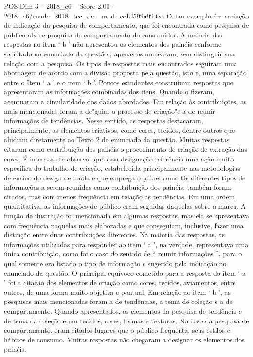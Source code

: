 \begin{textsample}{POS Dim 3 – 2018\_c6 – Score 2.00 – 2018\_c6/enade\_2018\_tec\_des\_mod\_ce1d599a99.txt}
Outro exemplo é a variação de indicação da pesquisa de comportamento, que foi encontrada como pesquisa de público-alvo e pesquisa de comportamento do consumidor.
A maioria das respostas no item ‘ b ’ não apresentou os elementos dos painéis conforme solicitado no enunciado da questão ; apenas os nomearam, sem distinguir sua relação com a pesquisa.
Os tipos de respostas mais encontrados seguiram uma abordagem de acordo com a divisão proposta pela questão, isto é, uma separação entre o Item ‘ a ’ e o item ‘ b ’.
Poucos estudantes construíram respostas que apresentaram as informações combinadas dos itens.
Quando o fizeram, acentuaram a circularidade dos dados abordados.
Em relação às contribuições, as mais mencionadas foram a de"guiar o processo de criação"e a de reunir informações de tendências.
Nesse sentido, as respostas destacaram, principalmente, os elementos criativos, como cores, tecidos, dentre outros que aludiam diretamente ao Texto 2 do enunciado da questão.
Muitas respostas citaram como contribuição dos painéis o procedimento de criação de extração das cores.
É interessante observar que essa designação referência uma ação muito específica do trabalho de criação, estabelecida principalmente nas metodologias de ensino do design de moda e que emprega o painel como Os diferentes tipos de informações a serem reunidas como contribuição dos painéis, também foram citados, mas com menos frequência em relação às tendências.
Em uma ordem quantitativa, as informações de público eram seguidas daquelas sobre a marca.
A função de ilustração foi mencionada em algumas respostas, mas ela se apresentava com frequência naquelas mais elaboradas e que conseguiam, inclusive, fazer uma distinção entre duas contribuições diferentes.
Na maioria das respostas, as informações utilizadas para responder ao item ‘ a ’, na verdade, representava uma única contribuição, como foi o caso do sentido de “ reunir informações ”, para o qual somente era listado o tipo de informação e sugerido pela indicação no enunciado da questão.
O principal equívoco cometido para a resposta do item ‘ a ’ foi a citação dos elementos de criação como cores, tecidos, aviamentos, entre outros, de uma forma muito objetiva e pontual.
Em relação ao item ‘ b ’, as pesquisas mais mencionadas foram a de tendências, a tema de coleção e a de comportamento.
Quando apresentados, os elementos da pesquisa de tendência e de tema da coleção eram tecidos, cores, formas e texturas.
No caso da pesquisa de comportamento, eram citados lugares que o público frequenta, seus estilos e hábitos de consumo.
Muitas respostas não chegaram a designar os elementos dos painéis.

\end{textsample}
